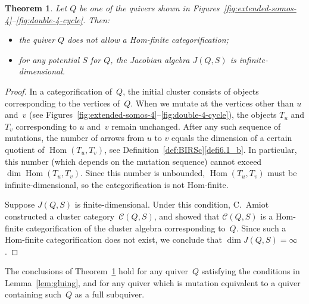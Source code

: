 \documentclass[10pt]{amsart}
\newtheorem{theorem}{Theorem}[section]
\theoremstyle{definition}
\DeclareMathOperator{\Hom}{Hom}
\begin{document}


\begin{theorem}
\label{th:universal-no-categorification}
Let $Q$ be one of the quivers shown in Figures~\ref{fig:extended-somos-4}--\ref{fig:double-4-cycle}. 
Then:
\begin{itemize}%
\item
the quiver $Q$ does not allow a Hom-finite categorification; 
\item
for any potential $S$ for $Q$, the Jacobian algebra $J(Q,S)$ is infinite-dimensional.
\end{itemize}
\end{theorem}

\begin{proof}
In a categorification of~$Q$, the initial cluster consists of objects corresponding to the vertices of~$Q$. When we mutate at the vertices other than $u$ and~$v$ (see Figures~\ref{fig:extended-somos-4}--\ref{fig:double-4-cycle}), the objects $T_u$ and $T_v$ corresponding to $u$ and~$v$ remain unchanged. After any such sequence of mutations, the number of arrows from $u$ to $v$ equals the dimension of a certain quotient of $\Hom(T_u,T_v)$, see Definition~\ref{def:BIRSc}\ref{defi6.1_b}. 
In particular, this number (which depends on the mutation sequence) cannot exceed $\dim\Hom(T_u,T_v)$. 
Since this number is unbounded, $\Hom(T_u,T_v)$ must be infinite-dimensional, so the categorification is not Hom-finite. 

Suppose $J(Q,S)$ is finite-dimensional. Under this condition, 
C.~Amiot~\cite{amiot} constructed a cluster category~$\mathcal C(Q,S)$,
and showed that $\mathcal C(Q,S)$ is a Hom-finite categorification of the cluster algebra corresponding to~$Q$.
Since such a Hom-finite categorification does not exist, we conclude that $\dim J(Q,S)=\infty$. 
\end{proof}

The conclusions of Theorem~\ref{th:universal-no-categorification} hold for any quiver~$Q$ satisfying the conditions in Lemma~\ref{lem:gluing}, and for any quiver which is mutation equivalent to a quiver containing such~$Q$ as a full subquiver. 
\end{document}
